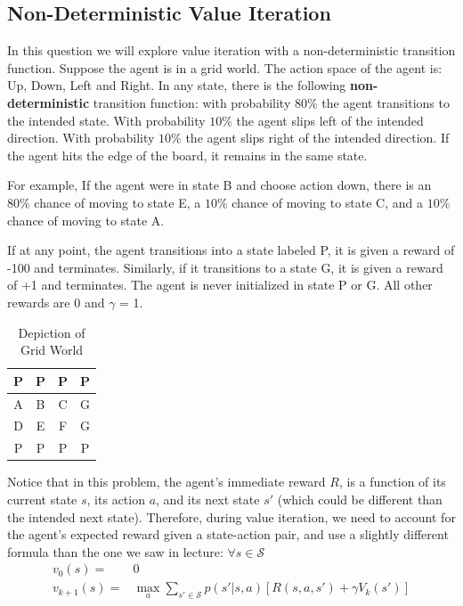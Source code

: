 \documentclass[11pt,addpoints,answers]{exam}
\begin{document}
\subsection{Non-Deterministic Value Iteration}
\begin{questions}
\question
    In this question we will explore value iteration with a non-deterministic transition function. Suppose the agent is in a grid world. The action space of the agent is: Up, Down, Left and Right. In any state, there is the following \textbf{non-deterministic} transition function: with probability $80\%$ the agent transitions to the intended state. With probability $10\%$ the agent slips left of the intended direction. With probability $10\%$ the agent slips right of the intended direction. If the agent hits the edge of the board, it remains in the same state.
    
    For example, If the agent were in state B and choose action down, there is an $80\%$ chance of moving to state E, a $10\%$ chance of moving to state C, and a $10\%$ chance of moving to state A. 
    
    If at any point, the agent transitions into a state labeled P, it is given a reward of -100 and terminates. Similarly, if it transitions to a state G, it is given a reward of +1 and terminates. The agent is never initialized in state P or G. All other rewards are 0 and $\gamma$ = 1.
    \begin{table}[H]
    \begin{center}
      \begin{tabular}{ | c | c | c | c | }
        \hline
        P & P & P & P \\ \hline
        A & B & C & G \\ \hline
        D & E & F & G \\ \hline
        P & P & P & P \\ \hline
      \end{tabular}
      \caption{Depiction of Grid World}
    \end{center}
    \end{table}
    Notice that in this problem, the agent's immediate reward $R$, is a function of its current state $s$, its action $a$, and its next state $s'$ (which could be different than the intended next state). Therefore, during value iteration, we need to account for the agent's expected reward given a state-action pair, and use a slightly different formula than the one we saw in lecture: $\forall s \in \mathcal{S}$
    \begin{align*}
        v_0(s) =& 0\\
        v_{k+1}(s) =& \max_a \sum_{s' \in \mathcal{S}} p (s'|s,a)\left[R(s,a,s')+\gamma V_k(s')\right]
    \end{align*}
    

\end{questions}
\end{document}
